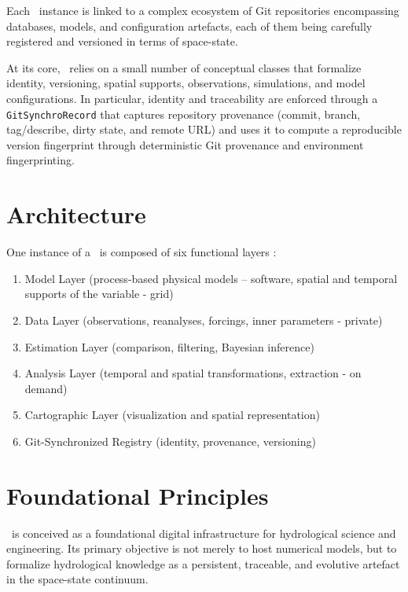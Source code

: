 Each \hydrot\ instance is linked to a complex ecosystem of Git repositories encompassing databases, models, and configuration artefacts, each of them being carefully registered and versioned in terms of space-state.





At its core, \hydrot\ relies on a small number of conceptual classes that formalize identity, versioning, spatial supports, observations, simulations, and model configurations. In particular, identity and traceability are enforced through a \texttt{GitSynchroRecord} that captures repository provenance (commit, branch, tag/describe, dirty state, and remote URL) and uses it to compute a reproducible version fingerprint through deterministic Git provenance and environment fingerprinting.


\section{Architecture}

One instance of a \hydrot\ is composed of six functional layers :

\begin{enumerate}
    \item Model Layer (process-based physical models -- software, spatial and temporal supports of the variable - grid)
    \item Data Layer (observations, reanalyses, forcings, inner parameters - private)
    \item Estimation Layer (comparison, filtering, Bayesian inference)
    \item Analysis Layer (temporal and spatial transformations, extraction - on demand)
    \item Cartographic Layer (visualization and spatial representation)
    \item Git-Synchronized Registry (identity, provenance, versioning)
\end{enumerate}

\section{Foundational Principles}

\hydrot\ is conceived as a foundational digital infrastructure for hydrological science and engineering. Its primary objective is not merely to host numerical models, but to formalize hydrological knowledge as a persistent, traceable, and evolutive artefact in the space-state continuum.

